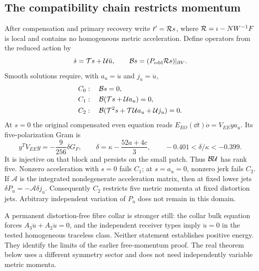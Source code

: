 \subsection{The compatibility chain restricts momentum}
After compensation and primary recovery write
$t'=\mathcal R s$, where $\mathcal R=\iota-NW^{-1}F$ is local and contains no
homogeneous metric acceleration. Define operators from the reduced action by
\begin{equation}
 \dot s=\mathcal T s+\mathcal U\ddot u,\qquad
 \mathcal B s=(P_{\mathrm{odd}}\mathcal R s)|_{\partial V}.
 \label{eq:generator}
\end{equation}
Smooth solutions require, with $a_u=\ddot u$ and $j_u=\dddot u$,
\begin{align}
 C_0&:\quad \mathcal B s=0,\nonumber\\
 C_1&:\quad \mathcal B(\mathcal T s+\mathcal Ua_u)=0,\nonumber\\
 C_2&:\quad \mathcal B(\mathcal T^2s+\mathcal T\mathcal Ua_u+\mathcal Uj_u)=0.
 \label{eq:compatibility}
\end{align}
At $s=0$ the original compensated even equation reads
$E_{EO}(\dd t)\dot o=V_{EE}ya_u$.
Its five-polarization Gram is
\begin{equation}
 y^TV_{EE}y=-\frac9{256}\delta G_F,
 \qquad \delta=\kappa-\frac{52a+4c}{3},
 \qquad -0.401<\delta/\kappa<-0.399.\label{eq:boundaryrank}
\end{equation}
It is injective on that block and persists on the small patch. Thus
$\mathcal B\mathcal U$ has rank five. Nonzero acceleration with $s=0$ fails
$C_1$; at $s=a_u=0$, nonzero jerk fails $C_2$.
If $\mathcal A$ is the integrated nondegenerate acceleration matrix,
then at fixed lower jets $\delta P_u=-\mathcal A\delta j_u$.
Consequently $C_2$ restricts five metric momenta at fixed distortion jets.
Arbitrary independent variation of $P_u$ does not remain in this domain.

A permanent distortion-free fibre collar is stronger still: the collar
bulk equation forces $A_3\dddot u+A_2\ddot u=0$, and the independent
receiver types imply $\ddot u=0$ in the tested homogeneous traceless class.
Neither statement establishes positive energy. They identify the limits
of the earlier free-momentum proof. The real theorem below uses a
different symmetry sector and does not need independently variable metric
momenta.
